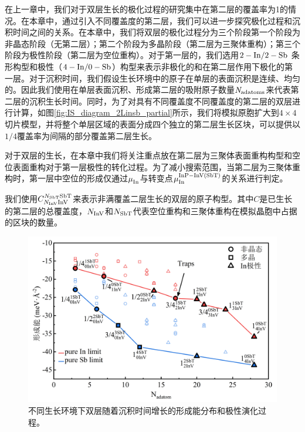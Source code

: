 在上一章中，我们对于双层生长的极化过程的研究集中在第二层的覆盖率为1的情况。在本章中，通过引入不同覆盖度的第二层，我们可以进一步探究极化过程和沉积时间之间的关系。在本章中，我们将双层的极化过程分为三个阶段\chinesecolon 第一个阶段为非晶态阶段（无第二层）；第二个阶段为多晶阶段（第二层为三聚体重构）；第三个阶段为极性阶段（第二层为空位重构）。对于第一层的，我们选用$\rm 2-In/2-Sb$ 条形构型和极性（$\rm 4-In/0-Sb$）构型来表示非极化的和在第二层作用下极化的第一层。对于沉积时间，我们假设生长环境中的原子在单层的表面沉积是连续、均匀的。因此我们使用在单层表面沉积、形成第二层的吸附原子数量$\it N_{\rm adatoms} \it$来代表第二层的沉积生长时间。同时，为了对具有不同覆盖度不同覆盖度的第二层的双层进行计算，如图\ref{fig:IS_diagram_2Linsb_partial}所示，我们将模拟原胞扩大到$4 \times 4$切片模型，并将整个单层区域的表面分成四个独立的第二层生长区块，可以提供以$1/ 4$覆盖率为间隔的部分覆盖第二层生长。

对于双层的生长，在本章中我们将关注重点放在第二层为三聚体表面重构构型和空位表面重构对于第一层极性的转化过程。为了减小搜索范围，当第二层为三聚体重构时，第一层中空位的形成仅通过$\it \mu_{\rm In}^{\rm } \it$与转变点$\it \mu_{\rm In}^{\rm InP-InV\left(SbT\right)} \it$的关系进行判定。

我们使用$C_{N_{\rm InV}\rm InV}^{N_{\rm SbT}\rm SbT}$来表示非满覆盖二层生长的双层的原子构型。其中$C$是已生长的第二层的总覆盖度，$N_{\rm InV}$和$N_{\rm SbT}$代表空位重构和三聚体重构在模拟晶胞中占据的区块的数量。

\begin{figure}[htb]
    \includegraphics{pic/IS_DFT_2LInSb_partEnergy.png}
    \caption{不同生长环境下双层随着沉积时间增长的形成能分布和极性演化过程。}
    \label{fig:IS_DFT_2LInSb_partEnergy}
\end{figure}

